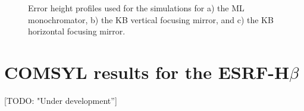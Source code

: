\documentclass{iucr}              %
\newcommand{\todo}[1]{{\color{red}[TODO: "#1'']}}
\begin{document}
\begin{figure}
\caption{Error height profiles used for the simulations for a) the ML monochromator, b) the KB vertical focusing mirror, and c) the KB horizontal focusing mirror.}
\end{figure}

\section{COMSYL results for the ESRF-H$\beta$}
\todo{Under development}




\end{document}
